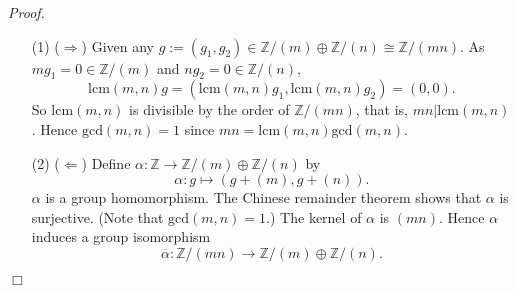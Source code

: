 \documentclass{article}
\begin{document}
\emph{Proof.}
\begin{enumerate}
\item[(1)]
  ($\Longrightarrow$)
  Given any $g := (g_1, g_2) \in \mathbb{Z}/(m) \oplus \mathbb{Z}/(n) \cong \mathbb{Z}/(mn)$.
  As $m g_1 = 0 \in \mathbb{Z}/(m)$ and $n g_2 = 0 \in \mathbb{Z}/(n)$,
  \[
    \mathrm{lcm}(m,n) g
    = (\mathrm{lcm}(m,n) g_1, \mathrm{lcm}(m,n) g_2)
    = (0,0).
  \]
  So $\mathrm{lcm}(m,n)$ is divisible by the order of $\mathbb{Z}/(mn)$, that is,
  $mn|\mathrm{lcm}(m,n)$.
  Hence $\mathrm{gcd}(m,n) = 1$ since $mn = \mathrm{lcm}(m,n) \mathrm{gcd}(m,n)$.

\item[(2)]
  ($\Longleftarrow$)
  Define $\alpha: \mathbb{Z} \to \mathbb{Z}/(m) \oplus \mathbb{Z}/(n)$ by
  \[
    \alpha: g \mapsto (g + (m), g + (n)).
  \]
  $\alpha$ is a group homomorphism.
  The Chinese remainder theorem shows that $\alpha$ is surjective.
  (Note that $\mathrm{gcd}(m,n) = 1$.)
  The kernel of $\alpha$ is $(mn)$.
  Hence $\alpha$ induces a group isomorphism
  \[
    \overline{\alpha}: \mathbb{Z}/(mn) \to \mathbb{Z}/(m) \oplus \mathbb{Z}/(n).
  \]
\end{enumerate}
$\Box$ \\\\



\end{document}
